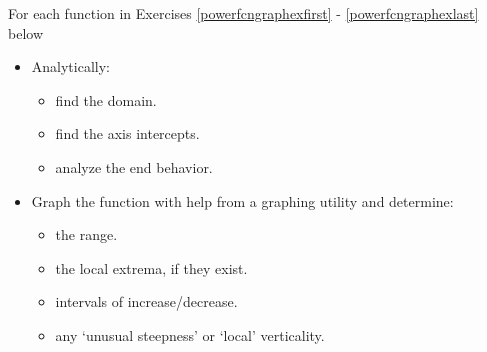For each function in Exercises \ref{powerfcngraphexfirst} - \ref{powerfcngraphexlast} below 

\begin{itemize}

\item Analytically:

\begin{multicols}{3}

\begin{itemize}

\item find the domain.

\item find the axis intercepts.

\item analyze the end behavior.

\end{itemize}

\end{multicols}

\item Graph the function with help from a graphing utility and determine:

\begin{multicols}{2}

\begin{itemize}

\item  the range.

\item the local extrema, if they exist.

\end{itemize}

\end{multicols}

\begin{multicols}{2}

\begin{itemize}

\item intervals of increase/decrease.

\item any `unusual steepness' or `local' verticality.

\end{itemize}

\end{multicols}

\begin{multicols}{2}

\begin{itemize}


\end{itemize}
\end{multicols}
\end{itemize}

